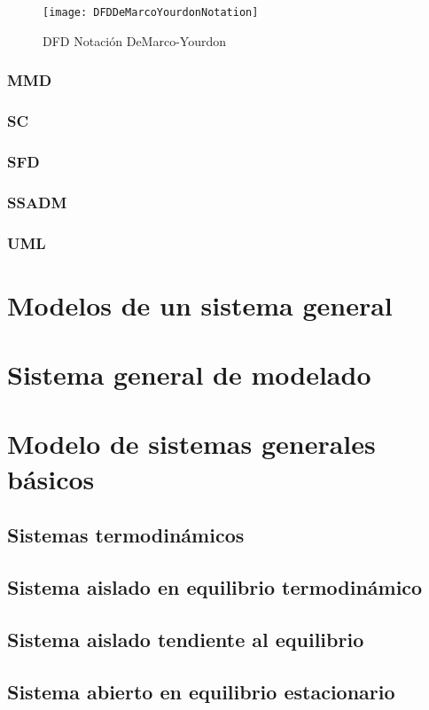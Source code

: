 \begin{figure}[h]
  \centering
  \texttt{[image: DFDDeMarcoYourdonNotation]}
  \caption{DFD Notación DeMarco-Yourdon \cite{Dixit-2007}}
  \centering
  \label{fig:DFDDeMarcoYourdonNotation} %
\end{figure}


\subsubsection{MMD}
\subsubsection{SC}
\subsubsection{SFD}
\subsubsection{SSADM}
\subsubsection{UML}

\section{Modelos de un sistema general}
\section{Sistema general de modelado}
\section{Modelo de sistemas generales básicos}
\subsection{Sistemas termodinámicos}
\subsection{Sistema aislado en equilibrio termodinámico}
\subsection{Sistema aislado tendiente al equilibrio}
\subsection{Sistema abierto en equilibrio estacionario}
